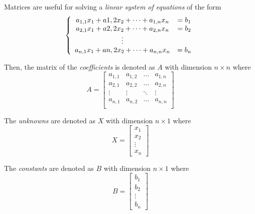 \begin{definition}
    Matrices are useful for solving a \textit{linear system of equations} of the form
    \begin{equation}
        \left\{
        \begin{array}{c c}
            a_{1, 1} x_1 + a{1, 2} x_2 + \cdots + a_{1, n} x_n &= b_1 \\
            a_{2, 1} x_1 + a{2, 2} x_2 + \cdots + a_{2, n} x_n &= b_2 \\
            \vdots &\phantom{}  \\
            a_{n, 1} x_1 + a{n, 2} x_2 + \cdots + a_{n, n} x_n &= b_n \\
        \end{array}
        \right.
    \end{equation}
    
    Then, the matrix of the \textit{coefficients} is denoted as $A$ with dimension $n \times n$ where
    \begin{equation}
        A = \begin{bmatrix}
            a_{1, 1} & a_{1, 2} & \dots  & a_{1, n} \\
            a_{2, 1} & a_{2, 2} & \dots  & a_{2, n} \\
            \vdots   & \vdots   & \ddots & \vdots   \\
            a_{n, 1} & a_{n, 2} & \dots & a_{n, n} \\
        \end{bmatrix}
    \end{equation}
    
    The \textit{unknowns} are denoted as $X$ with dimension $n \times 1$ where
    \begin{equation}
        X = \begin{bmatrix}
            x_1 \\
            x_2 \\
            \vdots \\
            x_n
        \end{bmatrix}
    \end{equation}
    
    The \textit{constants} are denoted as $B$ with dimension $n \times 1$ where
    \begin{equation}
        B = \begin{bmatrix}
            b_1 \\
            b_2 \\
            \vdots \\
            b_n
        \end{bmatrix}
    \end{equation}
    

\end{definition}
